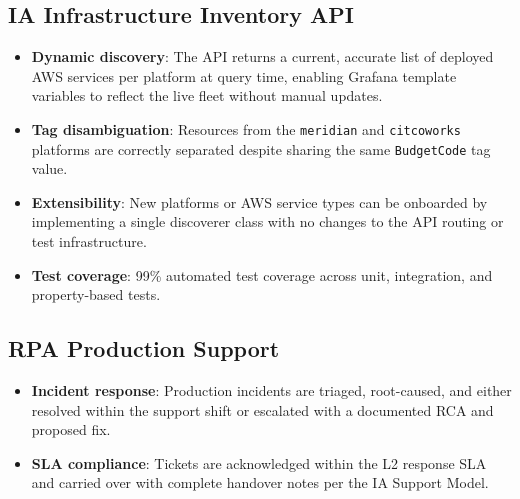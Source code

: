 \subsection{IA Infrastructure Inventory API}

\begin{itemize}
    \item \textbf{Dynamic discovery}: The API returns a current,
          accurate list of deployed AWS services per platform at query
          time, enabling Grafana template variables to reflect the live
          fleet without manual updates.

    \item \textbf{Tag disambiguation}: Resources from the
          \texttt{meridian} and \texttt{citcoworks} platforms are
          correctly separated despite sharing the same \texttt{BudgetCode}
          tag value.

    \item \textbf{Extensibility}: New platforms or AWS service types
          can be onboarded by implementing a single discoverer class
          with no changes to the API routing or test infrastructure.

    \item \textbf{Test coverage}: 99\% automated test coverage across
          unit, integration, and property-based tests.
\end{itemize}

\subsection{RPA Production Support}

\begin{itemize}
    \item \textbf{Incident response}: Production incidents are triaged,
          root-caused, and either resolved within the support shift or
          escalated with a documented RCA and proposed fix.

    \item \textbf{SLA compliance}: Tickets are acknowledged within the
          L2 response SLA and carried over with complete handover notes
          per the IA Support Model.
\end{itemize}



